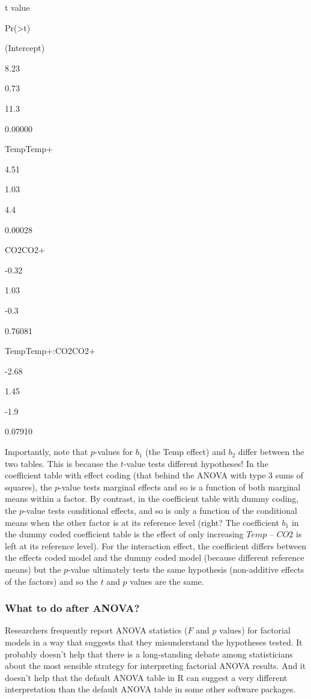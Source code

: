 \documentclass[]{book}
\begin{document}
t value

Pr(\textgreater\textbar t\textbar)

(Intercept)

8.23

0.73

11.3

0.00000

TempTemp+

4.51

1.03

4.4

0.00028

CO2CO2+

-0.32

1.03

-0.3

0.76081

TempTemp+:CO2CO2+

-2.68

1.45

-1.9

0.07910

Importantly, note that \(p\)-values for \(b_1\) (the Temp effect) and \(b_2\) differ between the two tables. This is because the \(t\)-value tests different hypotheses! In the coefficient table with effect coding (that behind the ANOVA with type 3 sums of squares), the \(p\)-value tests marginal effects and so is a function of both marginal means within a factor. By contrast, in the coefficient table with dummy coding, the \(p\)-value tests conditional effects, and so is only a function of the conditional means when the other factor is at its reference level (right? The coefficient \(b_1\) in the dummy coded coefficient table is the effect of only increasing \(Temp\) -- \(CO2\) is left at its reference level). For the interaction effect, the coefficient differs between the effects coded model and the dummy coded model (because different reference means) but the \(p\)-value ultimately tests the same hypothesis (non-additive effects of the factors) and so the \(t\) and \(p\) values are the same.

\hypertarget{what-to-do-after-anova}{%
\subsubsection{What to do after ANOVA?}\label{what-to-do-after-anova}}

Researchers frequently report ANOVA statistics (\(F\) and \(p\) values) for factorial models in a way that suggests that they misunderstand the hypotheses tested. It probably doesn't help that there is a long-standing debate among statisticians about the most sensible strategy for interpreting factorial ANOVA results. And it doesn't help that the default ANOVA table in R can suggest a very different interpretation than the default ANOVA table in some other software packages.
\end{document}
